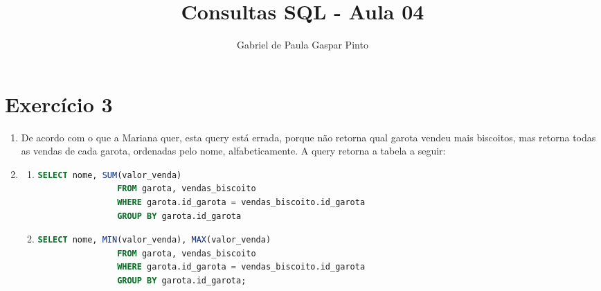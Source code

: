 \documentclass{article}
\title{Consultas SQL - Aula 04}
\author{Gabriel de Paula Gaspar Pinto}
\date{}
\begin{document}
\maketitle

\section*{Exercício 3}

\begin{enumerate}[label=\alph*.]
    \item De acordo com o que a Mariana quer, esta query está errada, porque não retorna qual garota vendeu mais biscoitos, mas retorna todas as vendas de cada garota, ordenadas pelo nome, alfabeticamente. A query retorna a tabela a seguir:
    
    \begin{center}
    \end{center}

    \item 
    \begin{enumerate}[label=\roman*., labelsep=0.5em, leftmargin=*]
        
        \item 
        \begin{adjustwidth}{1em}{0pt}
            \begin{lstlisting}[language=SQL]
                SELECT nome, SUM(valor_venda)
                FROM garota, vendas_biscoito
                WHERE garota.id_garota = vendas_biscoito.id_garota
                GROUP BY garota.id_garota
            \end{lstlisting}
        \end{adjustwidth}

        \item
        \begin{adjustwidth}{1em}{0pt}
            \begin{lstlisting}[language=SQL]
                SELECT nome, MIN(valor_venda), MAX(valor_venda)
                FROM garota, vendas_biscoito
                WHERE garota.id_garota = vendas_biscoito.id_garota
                GROUP BY garota.id_garota;
            \end{lstlisting}
        \end{adjustwidth}


\end{enumerate}
\end{enumerate}
\end{document}
